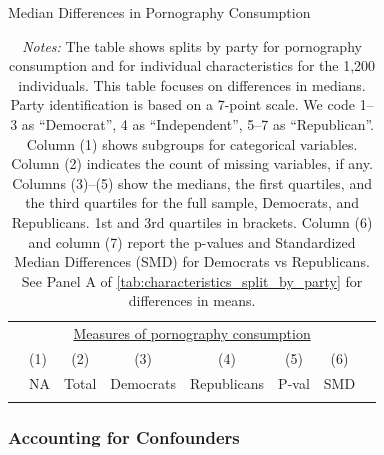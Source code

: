 \documentclass[12pt,twoside]{article}
\begin{document}
\begin{table}[ht] \centering \normalsize \setlength\tabcolsep{5 pt}
	\caption{Median Differences in Pornography Consumption}
	\label{tab:characteristics_split_by_party_medians}
	\begin{adjustbox}{max width=\textwidth}
		\begin{tabular}{@{\hspace{0\tabcolsep}}llrcccrr@{\hspace{0\tabcolsep}}}
			\toprule
			&\multicolumn{6}{c}{\underline{Measures of pornography consumption}}\\
			&\multicolumn{1}{l}{(1)}&\multicolumn{1}{c}{(2)}&\multicolumn{1}{c}{(3)}&\multicolumn{1}{c}{(4)}&\multicolumn{1}{c}{(5)}&\multicolumn{1}{c}{(6)}\\			
			&\multicolumn{1}{c}{NA}&\multicolumn{1}{c}{Total}&\multicolumn{1}{c}{Democrats}&\multicolumn{1}{c}{Republicans}&\multicolumn{1}{c}{P-val}&\multicolumn{1}{r}{SMD}\\
			\cmidrule{2-7}
			\\
			\bottomrule
		\end{tabular}
	\end{adjustbox}
	\caption*{\footnotesize \emph{Notes:}
		The table shows splits by party for pornography consumption and for individual characteristics for the 1,200 individuals.
		This table focuses on differences in medians.
		Party identification is based on a 7-point scale. We code 1--3 as ``Democrat'', 4 as ``Independent'', 5--7 as ``Republican''.
		Column (1) shows subgroups for categorical variables.
		Column (2) indicates the count of missing variables, if any.
		Columns (3)--(5) show the medians, the first quartiles, and the third quartiles for the full sample, Democrats, and Republicans.
		1st and 3rd quartiles in brackets.
		Column (6) and column (7) report the p-values and Standardized Median Differences (SMD) for Democrats vs Republicans.
		See Panel A of \cref{tab:characteristics_split_by_party} for differences in means.
	}
\end{table}


\FloatBarrier
\clearpage
\subsubsection{Accounting for Confounders}
\end{document}
